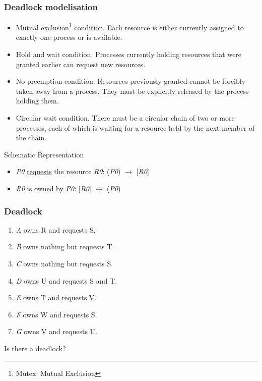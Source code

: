 \begin{frame}
  \frametitle{Deadlock modelisation}
  \begin{itemize}
    \item Mutual exclusion\footnote{Mutex: Mutual Exclusion} condition. Each resource is either currently assigned to exactly one process or is available.
    \item Hold and wait condition. Processes currently holding resources that were granted earlier can request new resources.
    \item No preemption condition. Resources previously granted cannot be forcibly taken away from a process. They must be explicitly released by the process holding them.
    \item Circular wait condition. There must be a circular chain of two or more processes, each of which is waiting for a resource held by the next member of the chain.
  \end{itemize}
  \begin{block}{Schematic Representation}
    \begin{itemize}
      \item \emph{P0} \underline{requests} the resource \emph{R0}: (\emph{P0}) $\longrightarrow$ [\emph{R0}]
      \item \emph{R0} \underline{is owned} by \emph{P0}: [\emph{R0}] $\longrightarrow$ (\emph{P0})
    \end{itemize}
  \end{block}
\end{frame}

\begin{frame}
  \frametitle{Deadlock}
  \begin{enumerate}
    \item \emph{A} owns R and requests S.
    \item \emph{B} owns nothing but requests T.
    \item \emph{C} owns nothing but requests S.
    \item \emph{D} owns U and requests S and T.
    \item \emph{E} owns T and requests V.
    \item \emph{F} owns W and requests S.
    \item \emph{G} owns V and requests U.
  \end{enumerate}
  Is there a deadlock?
\end{frame}

